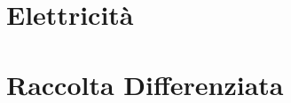 \documentclass[a4paper, 11pt, twoside, openright, italian]{memoir}
\begin{document}
\frontmatter




\mainmatter

\part{Elettricità}



%
%
%
%
%

\part{Raccolta Differenziata}

%
%
%
%
%
%
\end{document}
